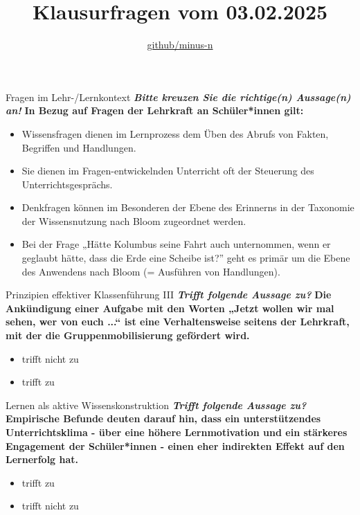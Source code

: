 \documentclass[a4paper]{article}
\title{Klausurfragen vom 03.02.2025}
\author{\href{https://github.com/minus-n/BiWi-Klausurzusammenfassung}{github/minus-n}}
\newcommand{\ACorrectAnswer}{\rlap{$\square$}{\raisebox{2pt}{\large\hspace{1pt}\ding{51}}}\hspace{-2.5pt}}
\newcommand{\AWrongAnswer}{\rlap{$\square$}{\large\hspace{1pt}\ding{55}}}
\newcommand{\AnUnsureAnswer}{\rlap{$\square$}{\large\hspace{1pt}\textbf?}}
\newcommand{\TheCorrectAnswer}{\rlap{\hspace{1.4pt}$\bullet$}{$\ocircle$}}
\newcommand{\TheWrongAnswer}{$\ocircle$}
\newcommand{\defaultCorrect}{\ding{51}}
\newcommand{\defaultWrong}{\ding{55}}
\newcommand{\defaultUnsure}{\textbf{?}}
\newenvironment{answers}{\begin{itemize}}{\end{itemize}}
\newcommand{\correct}{\defaultCorrect}
\newcommand{\wrong}{\defaultWrong}
\newcommand{\unsure}{\defaultUnsure}
\newenvironment{question}[2]{%
    \section[#1 \normalfont(#2)]{#1\\\small\normalfont\hyperlink{tableofcontents}{zurück zum Inhaltsverzeichnis}}%
}{%
    \newpage%
}
\newcommand{\questiontext}[1]{\textbf{#1}}
\newcommand{\assignment}[1]{\textbf{\textit{#1}}\newline}
\newenvironment{multiple-choice}[1]{%
    \begin{question}{#1}{Multiple Choice}%
    \renewenvironment{answers}{%
        \begin{multiple-choice-list}}{\end{multiple-choice-list}%
    }%
    \renewcommand{\correct}{\ACorrectAnswer}%
    \renewcommand{\wrong}{\AWrongAnswer}%
    \renewcommand{\unsure}{\AnUnsureAnswer}%
}%
{%
    \renewcommand{\correct}{\defaultCorrect}%
    \renewcommand{\wrong}{\defaultWrong}%
    \renewcommand{\unsure}{\defaultUnsure}%
    \end{question}%
}
\newenvironment{single-choice}[1]{%
    \begin{question}{#1}{Single Choice}%
    \renewenvironment{answers}{%
        \begin{single-choice-list}}{\end{single-choice-list}%
    }%
    \renewcommand{\correct}{\TheCorrectAnswer}%
    \renewcommand{\wrong}{\TheWrongAnswer}%
    \renewcommand{\unsure}{TheUnsureAnswer}%
}{%
    \renewcommand{\correct}{\defaultCorrect}%
    \renewcommand{\wrong}{\defaultWrong}%
    \renewcommand{\unsure}{\defaultUnsure}%
    \end{question}%
}
\begin{document}

\maketitle
\newpage
\hypertarget{tableofcontents}{}
\tableofcontents
\newpage


\begin{multiple-choice}{Fragen im Lehr-/Lernkontext}
    \assignment{Bitte kreuzen Sie die richtige(n) Aussage(n) an!}
    \questiontext{In Bezug auf Fragen der Lehrkraft an Schüler*innen gilt:}
    \begin{answers}
        \item[\correct] Wissensfragen dienen im Lernprozess dem Üben des Abrufs von Fakten, Begriffen und Handlungen.
        \item[\correct] Sie dienen im Fragen-entwickelnden Unterricht oft der Steuerung des Unterrichtsgesprächs.
        \item[\wrong] Denkfragen können im Besonderen der Ebene des Erinnerns in der Taxonomie der Wissensnutzung nach Bloom zugeordnet werden.
        \item[\wrong] Bei der Frage „Hätte Kolumbus seine Fahrt auch unternommen, wenn er geglaubt hätte, dass die Erde eine Scheibe ist?” geht es primär um die Ebene des Anwendens nach Bloom (= Ausführen von Handlungen).
    \end{answers}
\end{multiple-choice}

\begin{single-choice}{Prinzipien effektiver Klassenführung III}
    \assignment{Trifft folgende Aussage zu?}
    \questiontext{Die Ankündigung einer Aufgabe mit den Worten „Jetzt wollen wir mal sehen, wer von euch ...“ ist eine Verhaltensweise seitens der Lehrkraft, mit der die Gruppenmobilisierung gefördert wird.}
    \begin{answers}
        \item[\correct] trifft nicht zu
        \item[\wrong] trifft zu
    \end{answers}
\end{single-choice}

\begin{single-choice}{Lernen als aktive Wissenskonstruktion}
    \assignment{Trifft folgende Aussage zu?}
    \questiontext{Empirische Befunde deuten darauf hin, dass ein unterstützendes Unterrichtsklima - über eine höhere Lernmotivation und ein stärkeres Engagement der Schüler*innen - einen eher indirekten Effekt auf den Lernerfolg hat.}
    \begin{answers}
        \item[\correct] trifft zu
        \item[\wrong] trifft nicht zu 
    \end{answers}
\end{single-choice}
\end{document}
